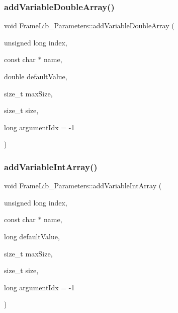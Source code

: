 \subsubsection{\texorpdfstring{add\+Variable\+Double\+Array()}{addVariableDoubleArray()}}
{\footnotesize\ttfamily void Frame\+Lib\+\_\+\+Parameters\+::add\+Variable\+Double\+Array (\begin{DoxyParamCaption}\item[{unsigned long}]{index,  }\item[{const char $\ast$}]{name,  }\item[{double}]{default\+Value,  }\item[{size\+\_\+t}]{max\+Size,  }\item[{size\+\_\+t}]{size,  }\item[{long}]{argument\+Idx = {\ttfamily -\/1} }\end{DoxyParamCaption})\hspace{0.3cm}{\ttfamily [inline]}}

\mbox{\label{class_frame_lib___parameters_abd0359eb3df2b07acf25ef5d1f2873fe}} 
\subsubsection{\texorpdfstring{add\+Variable\+Int\+Array()}{addVariableIntArray()}}
{\footnotesize\ttfamily void Frame\+Lib\+\_\+\+Parameters\+::add\+Variable\+Int\+Array (\begin{DoxyParamCaption}\item[{unsigned long}]{index,  }\item[{const char $\ast$}]{name,  }\item[{long}]{default\+Value,  }\item[{size\+\_\+t}]{max\+Size,  }\item[{size\+\_\+t}]{size,  }\item[{long}]{argument\+Idx = {\ttfamily -\/1} }\end{DoxyParamCaption})\hspace{0.3cm}{\ttfamily [inline]}}

\mbox{\label{class_frame_lib___parameters_a1ddc66de3c5b22c98c61692139d6edb1}} 
